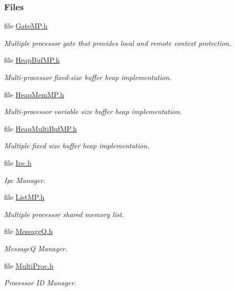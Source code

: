 \subsubsection*{Files}
\begin{DoxyCompactItemize}
\item 
file \hyperlink{_gate_m_p_8h}{Gate\-M\-P.\-h}
\begin{DoxyCompactList}\small\item\em Multiple processor gate that provides local and remote context protection. \end{DoxyCompactList}\item 
file \hyperlink{_heap_buf_m_p_8h}{Heap\-Buf\-M\-P.\-h}
\begin{DoxyCompactList}\small\item\em Multi-\/processor fixed-\/size buffer heap implementation. \end{DoxyCompactList}\item 
file \hyperlink{_heap_mem_m_p_8h}{Heap\-Mem\-M\-P.\-h}
\begin{DoxyCompactList}\small\item\em Multi-\/processor variable size buffer heap implementation. \end{DoxyCompactList}\item 
file \hyperlink{_heap_multi_buf_m_p_8h}{Heap\-Multi\-Buf\-M\-P.\-h}
\begin{DoxyCompactList}\small\item\em Multiple fixed size buffer heap implementation. \end{DoxyCompactList}\item 
file \hyperlink{_ipc_8h}{Ipc.\-h}
\begin{DoxyCompactList}\small\item\em Ipc Manager. \end{DoxyCompactList}\item 
file \hyperlink{_list_m_p_8h}{List\-M\-P.\-h}
\begin{DoxyCompactList}\small\item\em Multiple processor shared memory list. \end{DoxyCompactList}\item 
file \hyperlink{_message_q_8h}{Message\-Q.\-h}
\begin{DoxyCompactList}\small\item\em Message\-Q Manager. \end{DoxyCompactList}\item 
file \hyperlink{_multi_proc_8h}{Multi\-Proc.\-h}
\begin{DoxyCompactList}\small\item\em Processor I\-D Manager. \end{DoxyCompactList}\item 

\end{DoxyCompactItemize}
